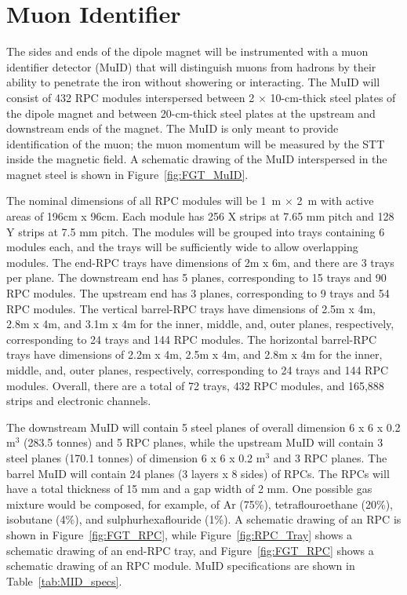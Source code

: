 \section{Muon Identifier}
\label{sec:muid}

The sides and ends of the dipole magnet will be instrumented
with a muon identifier
detector (MuID) that will distinguish muons from hadrons by their ability 
to penetrate the iron without showering or interacting.
The MuID will consist of 432 RPC modules
interspersed between 2 $\times$ 10-cm-thick steel plates of the 
dipole magnet and between 20-cm-thick steel plates at the upstream and
downstream ends of the magnet. 
The MuID is only meant to provide %
identification of the 
muon; the muon momentum %
will be measured by the STT inside the 
magnetic field. A schematic drawing of the MuID 
interspersed in the magnet steel is shown in Figure~\ref{fig:FGT_MuID}.

The nominal dimensions of all RPC modules will be 1~m $\times$ 2~m with
active areas of 196cm x 96cm. Each
module has 256 X strips
at 7.65 mm pitch and 128 Y strips at 7.5 mm pitch. The modules
will be grouped into trays containing 6 modules each, and the trays will
be sufficiently wide to allow overlapping modules. 
The end-RPC trays have dimensions of 2m x 6m, and there are 3 trays per plane.
The downstream end has 5 planes, corresponding to 15 trays and 90 RPC modules.
The upstream end has 3 planes, corresponding to 9 trays and 54 RPC modules.
The vertical barrel-RPC trays have dimensions of 2.5m x 4m, 2.8m x 4m, and
3.1m x 4m for the inner, middle, and, outer planes, respectively, corresponding
to 24 trays and 144 RPC modules. The horizontal
barrel-RPC trays have dimensions of 2.2m x 4m, 2.5m x 4m, and
2.8m x 4m for the inner, middle, and, outer planes, respectively, 
corresponding to 24 trays and 144 RPC modules. Overall, there are a total of
72 trays, 432 RPC modules, and 165,888 strips and electronic channels. 

The downstream MuID will contain 5 steel planes of 
overall dimension
6 x 6 x 0.2 m$^3$ (283.5 tonnes)
and 5 RPC planes, while the upstream MuID will contain 3 steel
planes (170.1 tonnes) of dimension 6 x 6 x 0.2 m$^3$ and 3 RPC planes. The barrel MuID will contain
24 planes (3 layers x 8 sides) of RPCs. The RPCs will have a total thickness 
of 15 mm and a gap width of 2 mm. One possible gas mixture would be composed, for example,
of Ar (75\%), tetraflouroethane (20\%), isobutane (4\%),
and sulphurhexaflouride (1\%). 
A schematic drawing of an RPC is shown in Figure~\ref{fig:FGT_RPC}, while
Figure~\ref{fig:RPC_Tray} shows a schematic drawing of an end-RPC tray,
and Figure~\ref{fig:FGT_RPC} shows a schematic drawing of an RPC module.
MuID specifications are shown in Table~\ref{tab:MID_specs}.

